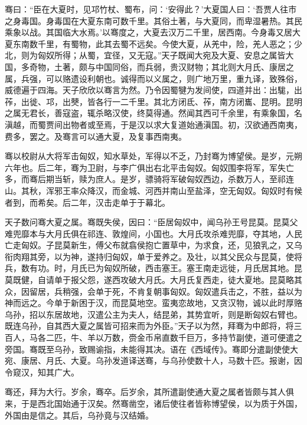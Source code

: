 \documentclass[12pt,UTF8]{ctexbook}
\begin{document}
骞曰：“臣在大夏时，见邛竹杖、蜀布，问：‘安得此？’大夏国人曰：‘吾贾人往市之身毒国。身毒国在大夏东南可数千里。其俗土著，与大夏同，而卑湿暑热。其民乘象以战。其国临大水焉。’以骞度之，大夏去汉万二千里，居西南。今身毒又居大夏东南数千里，有蜀物，此其去蜀不远矣。今使大夏，从羌中，险，羌人恶之；少北，则为匈奴所得；从蜀，宜径，又无寇。”天子既闻大宛及大夏、安息之属皆大国，多奇物，土著，颇与中国同俗，而兵弱，贵汉财物；其北则大月氏、康居之属，兵强，可以赂遗设利朝也。诚得而以义属之，则广地万里，重九译，致殊俗，威德遍于四海。天子欣欣以骞言为然。乃令因蜀犍为发间使，四道并出：出駹，出莋，出徙、邛，出僰，皆各行一二千里。其北方闭氐、莋，南方闭巂、昆明。昆明之属无君长，善寇盗，辄杀略汉使，终莫得通。然闻其西可千余里，有乘象国，名滇越，而蜀贾间出物者或至焉，于是汉以求大复道始通滇国。初，汉欲通西南夷，费多，罢之。及骞言可以通大夏，及复事西南夷。



骞以校尉从大将军击匈奴，知水草处，军得以不乏，乃封骞为博望侯。是岁，元朔六年也。后二年，骞为卫尉，与李广俱出右北平击匈奴。匈奴围李将军，军失亡多，而骞后期当斩，赎为庶人。是岁，骠骑将军破匈奴西边，杀数万人，至祁连山。其秋，浑邪王率众降汉，而金城、河西并南山至盐泽，空无匈奴。匈奴时有候者到，而希矣。后二年，汉击走单于于幕北。



天子数问骞大夏之属。骞既失侯，因曰：“臣居匈奴中，闻乌孙王号昆莫。昆莫父难兜靡本与大月氏俱在祁连、敦煌间，小国也。大月氏攻杀难兜靡，夺其地，人民亡走匈奴。子昆莫新生，傅父布就翕侯抱亡置草中，为求食，还，见狼乳之，又乌衔肉翔其旁，以为神，遂持归匈奴，单于爱养之。及壮，以其父民众与昆莫，使将兵，数有功。时，月氏已为匈奴所破，西击塞王。塞王南走远徙，月氏居其地。昆莫既健，自请单于报父怨，遂西攻破大月氏。大月氏复西走，徒大夏地。昆莫略其众，因留居，兵稍强，会单于死，不肯复朝事匈奴。匈奴遣兵击之，不胜，益以为神而远之。今单于新困于汉，而昆莫地空。蛮夷恋故地，又贪汉物，诚以此时厚赂乌孙，招以东居故地，汉遣公主为夫人，结昆弟，其势宜听，则是断匈奴右臂也。既连乌孙，自其西大夏之属皆可招来而为外臣。”天子以为然，拜骞为中郎将，将三百人，马各二匹，牛、羊以万数，赍金币帛直数千巨万，多持节副使，道可便遣之旁国。骞既至乌孙，致赐谕指，未能得其决。语在《西域传》。骞即分遣副使使大宛、康居、月氏、大夏。乌孙发道译送骞，与乌孙使数十人，马数十匹。报谢，因令窥汉，知其广大。



骞还，拜为大行。岁余，骞卒。后岁余，其所遣副使通大夏之属者皆颇与其人俱来，于是西北国始通于汉矣。然骞凿空，诸后使往者皆称博望侯，以为质于外国，外国由是信之。其后，乌孙竟与汉结婚。
\end{document}
